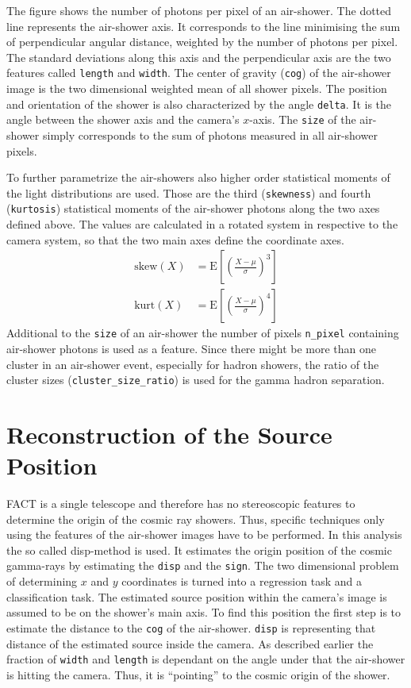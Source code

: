 %
The figure shows the number of photons per pixel of an air-shower. The dotted
line represents the air-shower axis. It corresponds to the line minimising the
sum of perpendicular angular distance, weighted by the number of photons per
pixel. The standard deviations along this axis and the perpendicular axis are
the two features called \texttt{length} and \texttt{width}. The center of
gravity (\texttt{cog}) of the air-shower image is the two dimensional weighted
mean of all shower pixels. The position and orientation of the shower is also
characterized by the angle \texttt{delta}. It is the angle between the shower
axis and the camera's $x$-axis. The \texttt{size} of the air-shower simply
corresponds to the sum of photons measured in all air-shower pixels.

To further parametrize the air-showers also higher order statistical moments of
the light distributions are used. Those are the third (\texttt{skewness}) and
fourth (\texttt{kurtosis}) statistical moments of the air-shower photons along
the two axes defined above. The values are calculated in a rotated system in
respective to the camera system, so that the two main axes define the
coordinate axes.
%
\begin{align}
  \text{skew}(X) &= \text{E}\left[\left(\frac{X-\mu}{\sigma}\right)^3\right] \label{eq:skew} \\
  \text{kurt}(X) &= \text{E}\left[\left(\frac{X-\mu}{\sigma}\right)^4\right]  \label{eq:kurt}
\end{align}
%
Additional to the \texttt{size} of an air-shower the number of pixels
\texttt{n\_pixel} containing air-shower photons is used as a feature. Since
there might be more than one cluster in an air-shower event, especially for
hadron showers, the ratio of the cluster sizes (\texttt{cluster\_size\_ratio})
is used for the gamma hadron separation.
%
\section{Reconstruction of the Source Position}
\label{sec:source_pos}%
%
FACT is a single telescope and therefore has no stereoscopic features to
determine the origin of the cosmic ray showers. Thus, specific techniques only
using the features of the air-shower images have to be performed. In this
analysis the so called disp-method is used. It estimates the origin position of
the cosmic gamma-rays by estimating the \texttt{disp} and the \texttt{sign}. The two
dimensional problem of determining $x$ and $y$ coordinates is turned into a
regression task and a classification task. The estimated source position within
the camera's image is assumed to be on the shower's main axis. To find this
position the first step is to estimate the distance to the \texttt{cog} of the
air-shower. \texttt{disp} is representing that distance of the estimated source inside
the camera. As described earlier the fraction of \texttt{width} and \texttt{length} is dependant
on the angle under that the air-shower is hitting the camera. Thus, it is
\enquote{pointing} to the cosmic origin of the shower.

